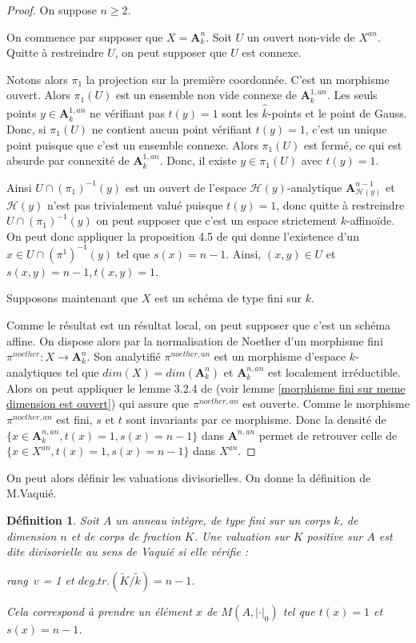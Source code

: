 \documentclass[11pt]{article}
\newcommand{\h}{\mathcal{H}}
\newcommand{\ana}{\mathbf{A}}
\newtheorem{defi}[thm]{Définition}
\begin{document}
\begin{proof}
On suppose $n \geq 2$.

On commence par supposer que $X= \ana^n_k$. Soit $U$ un ouvert non-vide de $X^{an}$. Quitte à restreindre $U$, on peut supposer que $U$ est connexe.

Notons alors $\pi_1$ la projection sur la première coordonnée. C'est un morphisme ouvert. Alors $\pi_1(U)$ est un ensemble non vide connexe de $\ana^{1,an}_k$. Les seuls points $y\in \ana^{1,an}_k$ ne vérifiant pas $t(y) =1$ sont les $\hat{\overline{k}}$-points et le point de Gauss. Donc, si $\pi_1(U)$ ne contient aucun point vérifiant $t(y)=1$, c'est un unique point puisque que c'est un ensemble connexe. Alors $\pi_1(U)$ est fermé, ce qui est absurde par connexité de $\ana^{1,an}_k$. Donc, il existe $y \in \pi_{1}(U)$ avec $t(y) = 1$.

Ainsi $U \cap (\pi_1)^{-1}(y)$ est un ouvert de l'espace $\h(y)$-analytique $\ana^{n-1}_{\h(y)}$ et $\h(y)$ n'est pas trivialement valué puisque $t(y) = 1$, donc quitte à restreindre $U \cap (\pi_1)^{-1}(y)$ on peut supposer que c'est un espace strictement $k$-affinoïde. On peut donc appliquer la proposition 4.5 de \cite{PoineauAngelique} qui donne l'existence d'un $x \in U \cap (\pi^1)^{-1}(y)$ tel que $s(x) = n-1$. Ainsi, $(x,y) \in U$ et $s(x,y)  =n-1, t(x,y) = 1$.

Supposons maintenant que $X$ est un schéma de type fini sur $k$. 

Comme le résultat est un résultat local, on peut supposer que c'est un schéma affine. On dispose alors par la normalisation de Noether d'un morphisme fini $\pi^{noether} : X \rightarrow \ana^n_k$. Son analytifié $\pi^{noether, an}$ est un morphisme d'espace $k$-analytiques tel que $dim(X) = dim(\ana^n_k)$ et $\ana^{n,an}_k$ est localement irréductible. Alors on peut appliquer le lemme 3.2.4 de \cite{BerkovichLivre} (voir lemme \ref{morphisme fini sur meme dimension est ouvert}) qui assure que $\pi^{noether, an}$ est ouverte. Comme le morphisme $\pi^{noether, an}$ est fini, $s$ et $t$ sont invariants par ce morphisme. Donc la densité de $\lbrace x \in \ana^{n,an}_k, t(x) = 1, s(x) = n-1\rbrace$ dans $\ana^{n,an}$ permet de retrouver celle de $\lbrace x \in X^{an}, t(x) = 1, s(x) = n-1\rbrace$ dans $X^{an}$.     
\end{proof}

On peut alors définir les valuations divisorielles. On donne la définition de M.Vaquié.

\begin{defi}
Soit $A$ un anneau intègre, de type fini sur un corps $k$, de dimension $n$ et de corps de fraction $K$. Une valuation sur $K$ positive sur $A$ est dite divisorielle au sens de Vaquié si elle vérifie :
\begin{center}
rang~$v$ = 1 et $deg.tr.(\tilde{K}/\tilde{k}) = n-1$.
\end{center}
Cela correspond à prendre un élément $x$ de $M(A, |\cdot|_0)$ tel que $t(x) =1$ et $s(x) =n-1$.
\end{defi}
\end{document}
